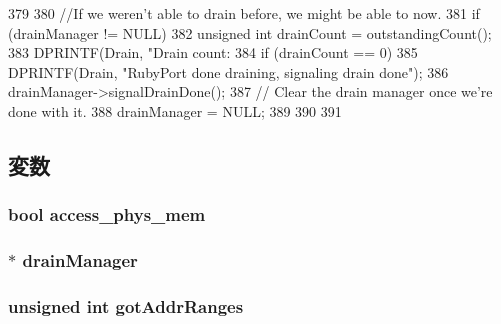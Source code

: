 \begin{DoxyCode}
379 {
380     //If we weren't able to drain before, we might be able to now.
381     if (drainManager != NULL) {
382         unsigned int drainCount = outstandingCount();
383         DPRINTF(Drain, "Drain count: %
384         if (drainCount == 0) {
385             DPRINTF(Drain, "RubyPort done draining, signaling drain done\n");
386             drainManager->signalDrainDone();
387             // Clear the drain manager once we're done with it.
388             drainManager = NULL;
389         }
390     }
391 }
\end{DoxyCode}


\subsection{変数}
\hypertarget{classRubyPort_a5925f629d4ec58811bba7c4fa6b4d64d}{
\subsubsection[{access\_\-phys\_\-mem}]{\setlength{\rightskip}{0pt plus 5cm}bool {\bf access\_\-phys\_\-mem}}}
\label{classRubyPort_a5925f629d4ec58811bba7c4fa6b4d64d}
\hypertarget{classRubyPort_a329b71fb934a93312ca0aacbf5a3f982}{
\subsubsection[{drainManager}]{$\ast$ {\bf drainManager}}}
\label{classRubyPort_a329b71fb934a93312ca0aacbf5a3f982}
\hypertarget{classRubyPort_a7194bb8c21c2c460cc31ecea9f08b1db}{
\subsubsection[{gotAddrRanges}]{\setlength{\rightskip}{0pt plus 5cm}unsigned int {\bf gotAddrRanges}}}
